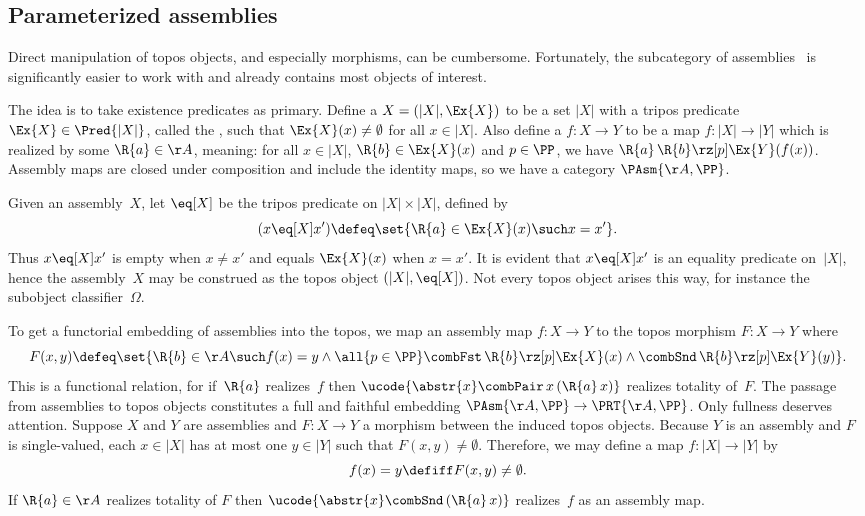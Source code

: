 \subsection{Parameterized assemblies}
\label{sec:unif-assemblies}

Direct manipulation of topos objects, and especially morphisms, can be cumbersome. Fortunately, the
subcategory of assemblies~\cite[Sect.~2.4]{oosten08:_realiz} is significantly easier to work with and already contains most objects of interest.

The idea is to take existence predicates as primary.
%
Define a  $X = (|X|, \Ex{X})$ to be a set $|X|$ with a tripos predicate $\Ex{X} \in \Pred{|X|}$, called the , such that $\Ex{X}(x) \neq \emptyset$ for all $x \in |X|$.
%
Also define a  $f : X \to Y$ to be a map $f : |X| \to |Y|$ which is realized by some $\R{a} \in \AA$, meaning: for all $x \in |X|$, $\R{b} \in \Ex{X}(x)$ and $p \in \PP$, we have $\R{a} \, \R{b} \rz[p] \Ex{Y}(f(x))$.
%
Assembly maps are closed under composition and include the identity maps, so we have a category $\PAsm{\AA, \PP}$. 

Given an assembly~$X$, let $\eq[X]$ be the tripos predicate on $|X| \times |X|$, defined by
%
\begin{equation*}
  (x \eq[X] x') \defeq \set{\R{a} \in \Ex{X}(x) \such x = x'}.
\end{equation*}
%
Thus $x \eq[X] x'$ is empty when $x \neq x'$ and equals $\Ex{X}(x)$ when $x = x'$.
%
It is evident that $x \eq[X] x'$ is an equality predicate on~$|X|$, hence the assembly~$X$ may be construed as the topos object $(|X|, \eq[X])$.
%
Not every topos object arises this way, for instance the subobject classifier~$\Omega$.

To get a functorial embedding of assemblies into the topos, we map an assembly map $f : X \to Y$ to the topos morphism $F : X \to Y$ where
%
\begin{equation*}
  F(x, y) \defeq \set{\R{b} \in \AA \such
    f(x) = y
    \land
    \all{p \in \PP}
    \combFst \, \R{b} \rz[p] \Ex{X}(x)
    \land
    \combSnd \, \R{b} \rz[p] \Ex{Y}(y)}.
\end{equation*}
%
This is a functional relation, for if~$\R{a}$ realizes~$f$ then $\ucode{\abstr{x} \combPair \, x \, (\R{a} \, x)}$ realizes totality of~$F$.
%
The passage from assemblies to topos objects constitutes a full and faithful embedding $\PAsm{\AA, \PP} \to \PRT{\AA, \PP}$. Only fullness deserves attention. Suppose $X$ and $Y$ are assemblies and $F : X \to Y$ a morphism between the induced topos objects. Because $Y$ is an assembly and $F$ is single-valued, each $x \in |X|$ has at most one $y \in |Y|$ such that $F(x, y) \neq \emptyset$. Therefore, we may define a map $f : |X| \to |Y|$ by
%
\begin{equation*}
  f(x) = y \defiff F(x,y) \neq \emptyset.
\end{equation*}
%
If $\R{a} \in \AA$ realizes totality of $F$ then $\ucode{\abstr{x} \combSnd \, (\R{a} \, x)}$ realizes~$f$ as an assembly map.

